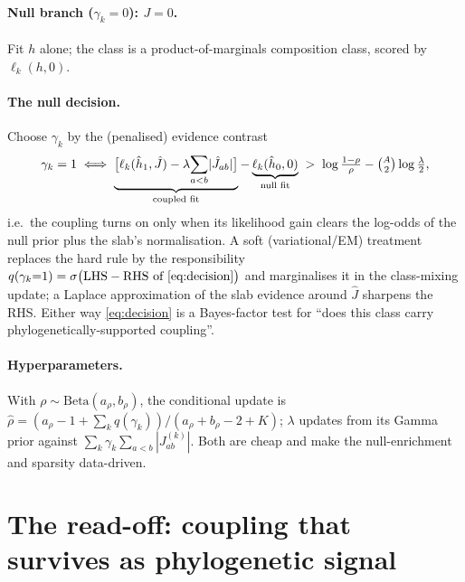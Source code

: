 \documentclass[11pt]{article}
\begin{document}
\paragraph{Null branch ($\gamma_k{=}0$): $J{=}0$.} Fit $h$ alone; the class is a
product-of-marginals composition class, scored by $\ell_k(h,0)$.

\paragraph{The null decision.} Choose $\gamma_k$ by the (penalised) evidence contrast
\begin{equation}
\label{eq:decision}
\gamma_k=1\iff
\underbrace{\big[\ell_k(\hat h_1,\hat J)-\lambda\!\sum_{a<b}\!|\hat J_{ab}|\big]}_{\text{coupled fit}}
-\underbrace{\ell_k(\hat h_0,0)}_{\text{null fit}}
\;>\;\log\tfrac{1-\rho}{\rho}-\tbinom{A}{2}\log\tfrac{\lambda}{2},
\end{equation}
i.e.\ the coupling turns on only when its likelihood gain clears the log-odds of the
null prior plus the slab's normalisation. A soft (variational/EM) treatment replaces the
hard rule by the responsibility
$q(\gamma_k{=}1)=\sigma\big(\text{LHS}-\text{RHS of \eqref{eq:decision}}\big)$
and marginalises it in the class-mixing update; a Laplace approximation of the slab
evidence around $\hat J$ sharpens the RHS. Either way \eqref{eq:decision} is a
Bayes-factor test for ``does this class carry phylogenetically-supported coupling''.

\paragraph{Hyperparameters.} With $\rho\sim\mathrm{Beta}(a_\rho,b_\rho)$, the conditional
update is $\hat\rho=(a_\rho-1+\sum_k q(\gamma_k))/(a_\rho+b_\rho-2+K)$; $\lambda$ updates
from its Gamma prior against $\sum_k\gamma_k\sum_{a<b}|J^{(k)}_{ab}|$. Both are cheap and
make the null-enrichment and sparsity data-driven.

\section{The read-off: coupling that survives as phylogenetic signal}
\label{sec:readoff}
\end{document}
